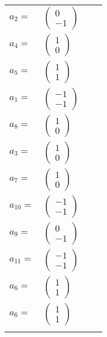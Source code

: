 \documentclass[1p]{elsarticle_modified}
\theoremstyle{definition}
\begin{document}
\begin{tabular}{m{7pt} m{180pt} m{7pt} m{180pt} }
\flushright $a_{2}=$&$\begin{pmatrix}0\\-1\end{pmatrix}$ \\
\flushright $a_{4}=$&$\begin{pmatrix}1\\0\end{pmatrix}$ \\
\flushright $a_{5}=$&$\begin{pmatrix}1\\1\end{pmatrix}$ \\
\flushright $a_{1}=$&$\begin{pmatrix}-1\\-1\end{pmatrix}$ \\
\flushright $a_{8}=$&$\begin{pmatrix}1\\0\end{pmatrix}$ \\
\flushright $a_{3}=$&$\begin{pmatrix}1\\0\end{pmatrix}$ \\
\flushright $a_{7}=$&$\begin{pmatrix}1\\0\end{pmatrix}$ \\
\flushright $a_{10}=$&$\begin{pmatrix}-1\\-1\end{pmatrix}$ \\
\flushright $a_{9}=$&$\begin{pmatrix}0\\-1\end{pmatrix}$ \\
\flushright $a_{11}=$&$\begin{pmatrix}-1\\-1\end{pmatrix}$ \\
\flushright $a_{6}=$&$\begin{pmatrix}1\\1\end{pmatrix}$\\ \flushright $a_{6}=$&$\begin{pmatrix}1\\1\end{pmatrix}$\\&\end{tabular}
\end{document}
